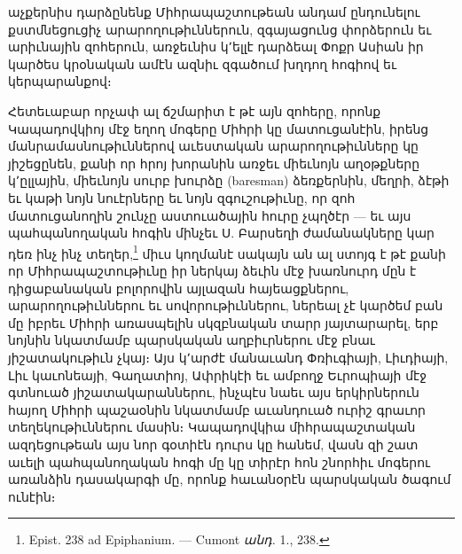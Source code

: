 \documentclass{article}
\begin{document}
{աչքերնիս դարձընենք Միհրապաշտութեան անդամ ընդունելու քստմնեցուցիչ արարողութիւններուն, զգայացունց փորձերուն եւ արիւնային զոհերուն, առջեւնիս կ՚ելլէ դարձեալ Փոքր Ասիան իր կարծես կրօնական ամէն ազնիւ զգածում խղդող հոգիով եւ կերպարանքով։

Հետեւաբար որչափ ալ ճշմարիտ է թէ այն զոհերը, որոնք Կապադովկիոյ մէջ եղող մոգերը Միհրի կը մատուցանէին, իրենց մանրամասնութիւններով աւեստական արարողութիւնները կը յիշեցընեն, քանի որ հրոյ խորանին առջեւ միեւնոյն աղօթքները կ՚ըլլային, միեւնոյն սուրբ խուրձը (baresman) ձեռքերնին, մեղրի, ձէթի եւ կաթի նոյն նուէրները եւ նոյն զգուշութիւնը, որ զոհ մատուցանողին շունչը աստուածային հուրը չպղծէր — եւ այս պահպանողական հոգին մինչեւ Ս. Բարսեղի ժամանակները կար դեռ ինչ ինչ տեղեր,\footnote{Epist. 238 ad Epiphanium. — Cumont \emph{անդ.} 1., 238.} միւս կողմանէ սակայն ան ալ ստոյգ է թէ քանի որ Միհրապաշտութիւնը իր ներկայ ձեւին մէջ խառնուրդ մըն է դիցաբանական բոլորովին այլազան հայեացքներու, արարողութիւններու եւ սովորութիւններու, ներեալ չէ կարծեմ բան մը իբրեւ Միհրի առասպելին սկզբնական տարր յայտարարել, երբ նոյնին նկատմամբ պարսկական աղբիւրներու մէջ բնաւ յիշատակութիւն չկայ։ Այս կ՚արժէ մանաւանդ Փռիւգիայի, Լիւդիայի, Լիւ կաւոնեայի, Գաղատիոյ, Ափրիկէի եւ ամբողջ Եւրոպիայի մէջ գտնուած յիշատակարաններու, ինչպէս նաեւ այս երկիրներուն հայող Միհրի պաշաօնին նկատմամբ աւանդուած ուրիշ գրաւոր տեղեկութիւններու մասին։ Կապադովկիա միհրապաշտական ազդեցութեան այս նոր գօտիէն դուրս կը հանեմ, վասն զի շատ աւելի պահպանողական հոգի մը կը տիրէր հոն շնորհիւ մոգերու առանձին դասակարգի մը, որոնք հաւանօրէն պարսկական ծագում ունէին։

}
\end{document}
